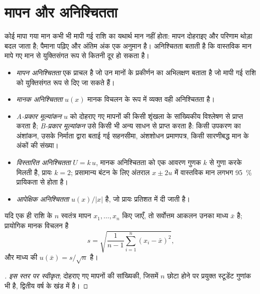 \section{मापन और अनिश्चितता}

कोई मापा गया मान कभी भी मापी गई राशि का यथार्थ मान नहीं होता: मापन
दोहराइए और परिणाम थोड़ा बदल जाता है; पैमाना पढ़िए और
अंतिम अंक एक अनुमान है। अनिश्चितता बताती है कि वास्तविक मान मापे गए
मान से युक्तिसंगत रूप से कितनी दूर हो सकता है।

\begin{definition}[मापन अनिश्चितता]\label{def:b1:lab-techniques-1:uncertainty}
\begin{itemize}
  \item \emph{मापन अनिश्चितता}
        एक प्राचल है जो उन मानों के प्रकीर्णन का अभिलक्षण बताता है
        जो मापी गई राशि को युक्तिसंगत रूप से दिए जा सकते हैं।
  \item \emph{मानक अनिश्चितता} $u(x)$
        मानक विचलन के रूप में व्यक्त वही अनिश्चितता है।
  \item \emph{A-प्रकार मूल्यांकन} $u$ को
        दोहराए गए मापनों की किसी शृंखला के सांख्यिकीय विश्लेषण से प्राप्त करता है;
        \emph{B-प्रकार मूल्यांकन} उसे किसी भी
        अन्य साधन से प्राप्त करता है: किसी उपकरण का अंशांकन, उसके निर्माता द्वारा बताई गई
        सहनसीमा, अंशशोधन प्रमाणपत्र, किसी सारणीबद्ध मान के अंकों
        की संख्या।
  \item \emph{विस्तारित अनिश्चितता}
        $U = k\,u$, मानक अनिश्चितता को एक आवरण
        गुणक $k$ से गुणा करके मिलती है, प्रायः $k = 2$; प्रसामान्य बंटन के लिए
        अंतराल $x \pm 2u$ में वास्तविक मान लगभग
        \qty{95}{\percent} प्रायिकता से होता है।
  \item \emph{आपेक्षिक अनिश्चितता}
        $u(x)/|x|$ है, जो प्रायः प्रतिशत में दी जाती है।
\end{itemize}
\end{definition}

\begin{proposition}[A-प्रकार मूल्यांकन]\label{prop:b1:lab-techniques-1:type-a}
यदि एक ही राशि के $n$ स्वतंत्र मापन $x_1, \dots, x_n$
किए जाएँ, तो सर्वोत्तम आकलन उनका माध्य $\bar x$ है; प्रायोगिक मानक
विचलन है
\[
  s = \sqrt{\frac{1}{n-1} \sum_{i=1}^{n} (x_i - \bar x)^2},
\]
और माध्य की  $u(\bar x) = s/\sqrt{n}$ है।
\end{proposition}
\begin{proof}[\omnameProof]
\emph{इस स्तर पर स्वीकृत}; दोहराए गए मापनों की सांख्यिकी,
जिसमें $n$ छोटा होने पर प्रयुक्त स्टूडेंट गुणांक भी है,
द्वितीय वर्ष के खंड में है।
\end{proof}

